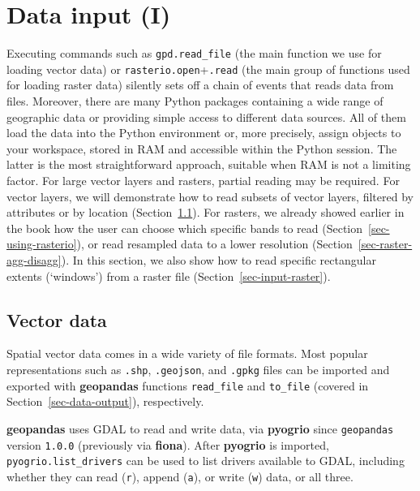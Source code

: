 \documentclass[
  letterpaper,
]{krantz}
\begin{document}
\section{Data input (I)}\label{sec-data-input}

Executing commands such as \texttt{gpd.read\_file} (the main function we
use for loading vector data) or \texttt{rasterio.open}+\texttt{.read}
(the main group of functions used for loading raster data) silently sets
off a chain of events that reads data from files. Moreover, there are
many Python packages containing a wide range of geographic data or
providing simple access to different data sources. All of them load the
data into the Python environment or, more precisely, assign objects to
your workspace, stored in RAM and accessible within the Python session.
The latter is the most straightforward approach, suitable when RAM is
not a limiting factor. For large vector layers and rasters, partial
reading may be required. For vector layers, we will demonstrate how to
read subsets of vector layers, filtered by attributes or by location
(Section~\ref{sec-input-vector}). For rasters, we already showed earlier
in the book how the user can choose which specific bands to read
(Section~\ref{sec-using-rasterio}), or read resampled data to a lower
resolution (Section~\ref{sec-raster-agg-disagg}). In this section, we
also show how to read specific rectangular extents (`windows') from a
raster file (Section~\ref{sec-input-raster}).

\subsection{Vector data}\label{sec-input-vector}

Spatial vector data comes in a wide variety of file formats. Most
popular representations such as \texttt{.shp}, \texttt{.geojson}, and
\texttt{.gpkg} files can be imported and exported with
\textbf{geopandas} functions \texttt{read\_file} and \texttt{to\_file}
(covered in Section~\ref{sec-data-output}), respectively.

\textbf{geopandas} uses GDAL to read and write data, via
\textbf{pyogrio} since \texttt{geopandas} version \texttt{1.0.0}
(previously via \textbf{fiona}). After \textbf{pyogrio} is imported,
\texttt{pyogrio.list\_drivers} can be used to list drivers available to
GDAL, including whether they can read
(\texttt{\textquotesingle{}r\textquotesingle{}}), append
(\texttt{\textquotesingle{}a\textquotesingle{}}), or write
(\texttt{\textquotesingle{}w\textquotesingle{}}) data, or all three.
\end{document}
